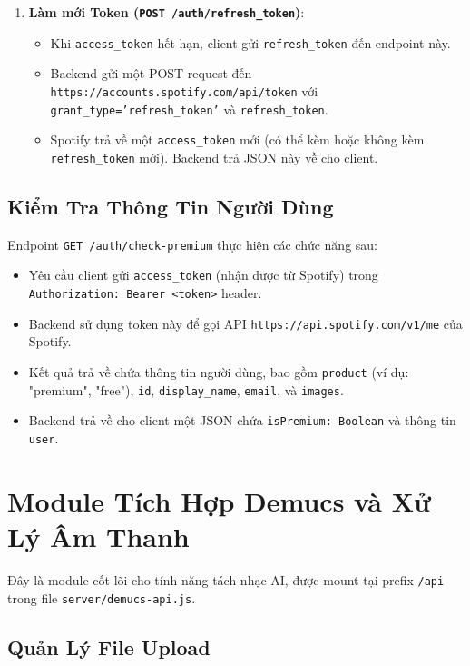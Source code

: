 \documentclass[12pt,a4paper]{article}
\begin{document}
\begin{enumerate}
    \item \textbf{Làm mới Token (\texttt{POST /auth/refresh\_token})}:
        \begin{itemize}
            \item Khi \texttt{access\_token} hết hạn, client gửi \texttt{refresh\_token} đến endpoint này.
            \item Backend gửi một POST request đến \texttt{https://accounts.spotify.com/api/token} với \texttt{grant\_type='refresh\_token'} và \texttt{refresh\_token}.
            \item Spotify trả về một \texttt{access\_token} mới (có thể kèm hoặc không kèm \texttt{refresh\_token} mới). Backend trả JSON này về cho client.
        \end{itemize}
\end{enumerate}

\subsection{Kiểm Tra Thông Tin Người Dùng}
\label{subsec:user-info-check}

Endpoint \texttt{GET /auth/check-premium} thực hiện các chức năng sau:
\begin{itemize}
    \item Yêu cầu client gửi \texttt{access\_token} (nhận được từ Spotify) trong \texttt{Authorization: Bearer <token>} header.
    \item Backend sử dụng token này để gọi API \texttt{https://api.spotify.com/v1/me} của Spotify.
    \item Kết quả trả về chứa thông tin người dùng, bao gồm \texttt{product} (ví dụ: "premium", "free"), \texttt{id}, \texttt{display\_name}, \texttt{email}, và \texttt{images}.
    \item Backend trả về cho client một JSON chứa \texttt{isPremium: Boolean} và thông tin \texttt{user}.
\end{itemize}

\section{Module Tích Hợp Demucs và Xử Lý Âm Thanh}
\label{sec:demucs-module}

Đây là module cốt lõi cho tính năng tách nhạc AI, được mount tại prefix \texttt{/api} trong file \texttt{server/demucs-api.js}.

\subsection{Quản Lý File Upload}
\label{subsec:file-upload}
\end{document}
